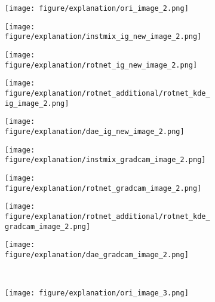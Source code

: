\documentclass{article} \usepackage{iclr2021_conference,times}
\begin{document}
\begin{figure}[h!]
\begin{subfigure}{.11\textwidth}
  \centering
  \texttt{[image: figure/explanation/ori\_image\_2.png]}
\end{subfigure}
\hspace{-2mm}
\begin{subfigure}{.11\textwidth}
  \centering
  \texttt{[image: figure/explanation/instmix\_ig\_new\_image\_2.png]}
\end{subfigure}
\hspace{-2mm}
\begin{subfigure}{.11\textwidth}
  \centering
  \texttt{[image: figure/explanation/rotnet\_ig\_new\_image\_2.png]}
\end{subfigure}
\hspace{-2mm}
\begin{subfigure}{.11\textwidth}
  \centering
  \texttt{[image: figure/explanation/rotnet\_additional/rotnet\_kde\_ig\_image\_2.png]}
\end{subfigure}
\hspace{-2mm}
\begin{subfigure}{.11\textwidth}
  \centering
  \texttt{[image: figure/explanation/dae\_ig\_new\_image\_2.png]}
\end{subfigure}
\hspace{-2mm}
\begin{subfigure}{.11\textwidth}
  \centering
  \texttt{[image: figure/explanation/instmix\_gradcam\_image\_2.png]}
\end{subfigure}
\hspace{-2mm}
\begin{subfigure}{.11\textwidth}
  \centering
  \texttt{[image: figure/explanation/rotnet\_gradcam\_image\_2.png]}
\end{subfigure}
\hspace{-2mm}
\begin{subfigure}{.11\textwidth}
  \centering
  \texttt{[image: figure/explanation/rotnet\_additional/rotnet\_kde\_gradcam\_image\_2.png]}
\end{subfigure}
\hspace{-2mm}
\begin{subfigure}{.11\textwidth}
  \centering
  \texttt{[image: figure/explanation/dae\_gradcam\_image\_2.png]}
\end{subfigure}\\
\begin{subfigure}{.11\textwidth}
  \centering
  \texttt{[image: figure/explanation/ori\_image\_3.png]}

\end{subfigure}
\end{figure}
\end{document}
